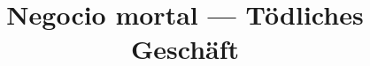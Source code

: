 \documentclass[a4paper, pagesize, DIV=14, fontsize=10pt, parskip=half, oneside, BCOR=5mm]{scrartcl}
\begin{document}
\title{Negocio mortal --- Tödliches Geschäft }
\date{}

\maketitle

\newcommand{\rn}[1]{\Rnode{#1}}
\newcommand{\rl}[2]{\ncline[linestyle=solid,arrows=->,nodesepA=0.5pt,linecolor=gray, strokeopacity=0.5]{#1}{#2}}
\newcommand{\sidenote}[1]{\marginpar[#1]{#1}}
\newcommand{\ul}[1]{\underline{#1}}



\end{document}

